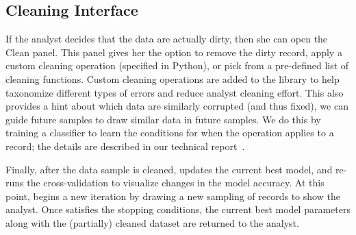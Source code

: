 \subsection{Cleaning Interface}
If the analyst decides that the data are actually dirty, then she can open the \textsf{Clean} panel.
This panel gives her the option to remove the dirty record, apply a custom cleaning operation (specified in Python), or pick from a pre-defined list of cleaning functions.
Custom cleaning operations are added to the library to help taxonomize different types of errors and reduce analyst cleaning effort.
This also provides a hint about which data are similarly corrupted (and thus fixed), we can guide future samples to draw similar data in future samples.
We do this by training a classifier to learn the conditions for when the operation applies to a record; the  details are described in our technical report~\cite{activecleanarxiv}.

Finally, after the data sample is cleaned, \sys updates the current best model, and re-runs the cross-validation to visualize changes in the model accuracy.
At this point, \sys begins a new iteration by drawing a new sampling of records to show the analyst.  
Once \sys satisfies the stopping conditions, the current best model parameters along with the (partially) cleaned dataset are returned to the analyst.

